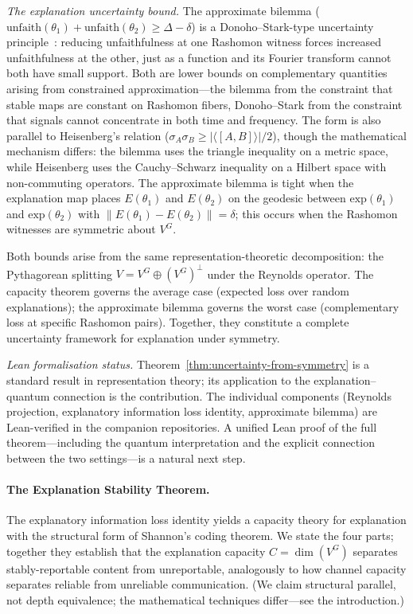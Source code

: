 \documentclass[11pt,a4paper]{article}
\begin{document}
\emph{The explanation uncertainty bound.}  The approximate bilemma ($\mathrm{unfaith}(\theta_1) + \mathrm{unfaith}(\theta_2) \geq \Delta - \delta$) is a Donoho--Stark-type uncertainty principle~\citep{donoho1989uncertainty}: reducing unfaithfulness at one Rashomon witness forces increased unfaithfulness at the other, just as a function and its Fourier transform cannot both have small support.  Both are lower bounds on complementary quantities arising from constrained approximation---the bilemma from the constraint that stable maps are constant on Rashomon fibers, Donoho--Stark from the constraint that signals cannot concentrate in both time and frequency.  The form is also parallel to Heisenberg's relation ($\sigma_A \sigma_B \geq |\langle[A,B]\rangle|/2$), though the mathematical mechanism differs: the bilemma uses the triangle inequality on a metric space, while Heisenberg uses the Cauchy--Schwarz inequality on a Hilbert space with non-commuting operators.  The approximate bilemma is tight when the explanation map places $E(\theta_1)$ and $E(\theta_2)$ on the geodesic between $\mathrm{exp}(\theta_1)$ and $\mathrm{exp}(\theta_2)$ with $\|E(\theta_1) - E(\theta_2)\| = \delta$; this occurs when the Rashomon witnesses are symmetric about $V^G$.

Both bounds arise from the same representation-theoretic decomposition: the Pythagorean splitting $V = V^G \oplus (V^G)^\perp$ under the Reynolds operator.  The capacity theorem governs the average case (expected loss over random explanations); the approximate bilemma governs the worst case (complementary loss at specific Rashomon pairs).  Together, they constitute a complete uncertainty framework for explanation under symmetry.

\emph{Lean formalisation status.}  Theorem~\ref{thm:uncertainty-from-symmetry} is a standard result in representation theory; its application to the explanation--quantum connection is the contribution.  The individual components (Reynolds projection, explanatory information loss identity, approximate bilemma) are Lean-verified in the companion repositories.  A unified Lean proof of the full theorem---including the quantum interpretation and the explicit connection between the two settings---is a natural next step.

\paragraph{The Explanation Stability Theorem.}
The explanatory information loss identity yields a capacity theory for explanation with the structural form of Shannon's coding theorem.  We state the four parts; together they establish that the explanation capacity $C = \dim(V^G)$ separates stably-reportable content from unreportable, analogously to how channel capacity separates reliable from unreliable communication.  (We claim structural parallel, not depth equivalence; the mathematical techniques differ---see the introduction.)
\end{document}
